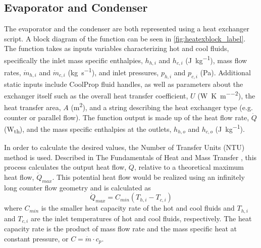 \subsection{Evaporator and Condenser}
\label{sec:heatex}
The evaporator and the condenser are both represented using a heat exchanger script.  A block diagram of the function can be seen in \autoref{fig:heatexblock_label}. The function takes as inputs variables characterizing hot and cool fluids, specifically the inlet mass specific enthalpies, $h_{h,i}$ and $h_{c,i}$ (\si{\joule\per\kilogram}), mass flow rates, $\dot{m}_{h,i}$ and $\dot{m}_{c,i}$ (\si{\kilogram\per\second}), and inlet pressures, $p_{h,i}$ and $p_{c,i}$ (\si{\pascal}). Additional static inputs include CoolProp fluid handles, as well as parameters about the exchanger itself such as the overall heat transfer coefficient, $U$ (\si{\watt\per\kelvin\per\meter\squared}), the heat transfer area, $A$ (\si{\meter\squared}), and a string describing the heat exchanger type (e.g. counter or parallel flow). The function output is made up of the heat flow rate, $\dot{Q}$ (\si{\watt}\textsubscript{th}), and the mass specific enthalpies at the outlets, $h_{h,o}$ and $h_{c,o}$ (\si{\joule\per\kilogram}). 


In order to calculate the desired values, the Number of Transfer Units (NTU) method is used. Described in The Fundamentals of Heat and Mass Transfer \cite{Incropera}, this process calculates the output heat flow, $\dot{Q}$, relative to a theoretical maximum heat flow, $\dot{Q}_{max}$. This potential heat flow would be realized using an infinitely long counter flow geometry and is calculated as
\begin{equation}
\dot{Q}_{max} = C_{min}\left(T_{h,i} - T_{c,i}\right)
\end{equation}
where $C_{min}$ is the smaller heat capacity rate of the hot and cool fluids and $T_{h,i}$ and $T_{c,i}$ are the inlet temperatures of hot and cool fluids, respectively. The heat capacity rate is the product of mass flow rate and the mass specific heat at constant pressure, or $ C = \dot{m} \cdot c_p $. 


